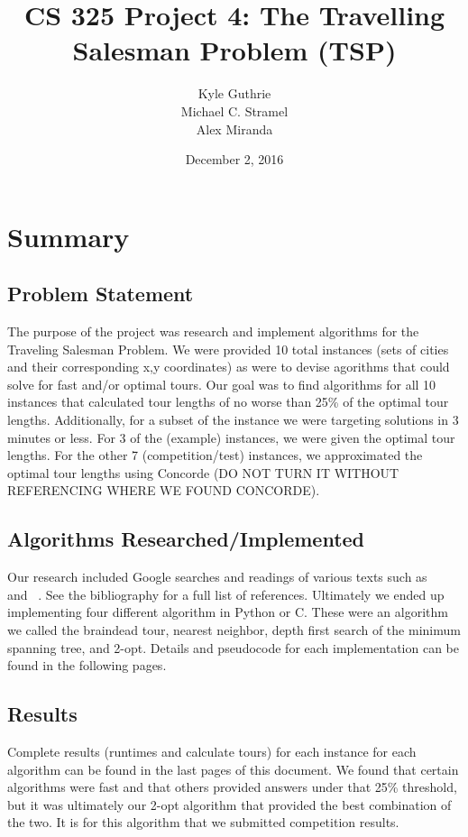 \documentclass[12pt]{article}
\title{CS 325 Project 4: The Travelling Salesman Problem (TSP)}
\author{ Kyle Guthrie \\
         Michael C. Stramel \\
         Alex Miranda
}
\date{December 2, 2016}
\begin{document}
\maketitle

\newpage
\section*{Summary}
\subsection*{Problem Statement}

The purpose of the project was research and implement algorithms for the Traveling Salesman Problem.  We were provided 10 total instances (sets of cities and their corresponding x,y coordinates) as were to devise agorithms that could solve for fast and/or optimal tours.  Our goal was to find algorithms for all 10 instances that calculated tour lengths of no worse than 25\% of the optimal tour lengths.  Additionally, for a subset of the instance we were targeting solutions in 3 minutes or less.  For 3 of the (example) instances, we were given the optimal tour lengths.  For the other 7 (competition/test) instances, we approximated the optimal tour lengths using Concorde (DO NOT TURN IT WITHOUT REFERENCING WHERE WE FOUND CONCORDE).

\subsection*{Algorithms Researched/Implemented}

Our research included Google searches and readings of various texts such as ~\cite{cormen/2009} and ~\cite{skiena/2008}.  See the bibliography for a full list of references.  Ultimately we ended up implementing four different algorithm in Python or C.  These were an algorithm we called the braindead tour, nearest neighbor, depth first search of the minimum spanning tree, and 2-opt.  Details and pseudocode for each implementation can be found in the following pages.

\subsection*{Results}

Complete results (runtimes and calculate tours) for each instance for each algorithm can be found in the last pages of this document.  We found that certain algorithms were fast and that others provided answers under that 25\% threshold, but it was ultimately our 2-opt algorithm that provided the best combination of the two.  It is for this algorithm that we submitted competition results.
\end{document}
